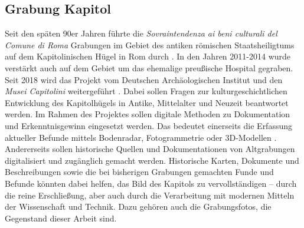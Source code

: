 \subsection{Grabung Kapitol}
Seit den späten 90er Jahren führte die \textit{Sovraintendenza ai beni culturali del Comune di Roma}{} Grabungen im Gebiet des antiken römischen Staatsheiligtums auf dem Kapitolinischen Hügel in Rom durch \cite{danti}{}. In den Jahren 2011-2014 wurde verstärkt auch auf dem Gebiet um das ehemalige preußische Hospital gegraben. Seit 2018 wird das Projekt vom Deutschen Archäologischen Institut und den \textit{Musei Capitolini}{} weitergeführt \cite{kapitol}{}. Dabei sollen Fragen zur \glqq kulturgeschichtlichen Entwicklung des Kapitolhügels in Antike, Mittelalter und Neuzeit\grqq{} \cite{kapitol}{} beantwortet werden.
Im Rahmen des Projektes sollen digitale Methoden zu Dokumentation und Erkenntnisgewinn eingesetzt werden. Das bedeutet einerseits die Erfassung aktueller Befunde mittels Bodenradar, Fotogrammetrie oder 3D-Modellen \cite{kapitol}. Andererseits sollen historische Quellen und Dokumentationen von Altgrabungen digitalisiert und zugänglich gemacht werden. 
Historische Karten, Dokumente und Beschreibungen sowie die bei bisherigen Grabungen gemachten Funde und Befunde könnten dabei helfen, das Bild des Kapitols zu vervollständigen -- durch die reine Erschließung, aber auch durch die Verarbeitung mit modernen Mitteln der Wissenschaft und Technik.
Dazu gehören auch die Grabungsfotos, die Gegenstand dieser Arbeit sind.




